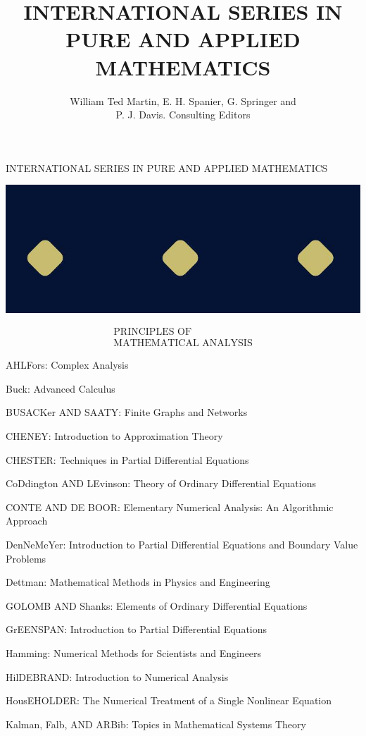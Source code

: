 \documentclass[10pt]{article}
\title{INTERNATIONAL SERIES IN PURE AND APPLIED MATHEMATICS }
\author{William Ted Martin, E. H. Spanier, G. Springer and\\
P. J. Davis. Consulting Editors}
\date{}
\begin{document}
\maketitle
INTERNATIONAL SERIES IN PURE AND APPLIED MATHEMATICS

\begin{center}
\includegraphics[max width=\textwidth]{2023_08_17_055ccbec3ce53a1b74ebg-001}
\end{center}

$$
\begin{gathered}
\text { PRINCIPLES OF } \\
\text { MATHEMATICAL ANALYSIS }
\end{gathered}
$$

AHLFors: Complex Analysis

Buck: Advanced Calculus

BUSACKer AND SAATY: Finite Graphs and Networks

CHENEY: Introduction to Approximation Theory

CHESTER: Techniques in Partial Differential Equations

CoDdington AND LEvinson: Theory of Ordinary Differential Equations

CONTE AND DE BOOR: Elementary Numerical Analysis: An Algorithmic Approach

DenNeMeYer: Introduction to Partial Differential Equations and Boundary Value Problems

Dettman: Mathematical Methods in Physics and Engineering

GOLOMB AND Shanks: Elements of Ordinary Differential Equations

GrEENSPAN: Introduction to Partial Differential Equations

Hamming: Numerical Methods for Scientists and Engineers

HilDEBRAND: Introduction to Numerical Analysis

HousEHOLDER: The Numerical Treatment of a Single Nonlinear Equation

Kalman, Falb, AND ARBib: Topics in Mathematical Systems Theory
\end{document}
